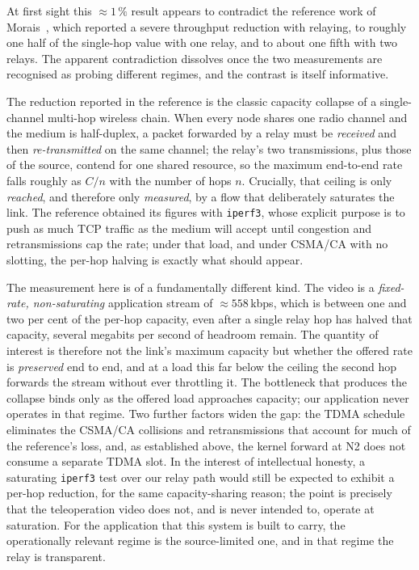 At first sight this $\approx 1\,\%$ result appears to contradict the reference
work of Morais~\cite{morais2024synchronization}, which reported a severe
throughput reduction with relaying, to roughly one half of the
single-hop value with one relay, and to about one fifth with two relays. The
apparent contradiction dissolves once the two measurements are recognised as
probing different regimes, and the contrast is itself informative.

The reduction reported in the reference is the classic capacity collapse of a
single-channel multi-hop wireless chain. When every node shares one radio
channel and the medium is half-duplex, a packet forwarded by a relay must be
\emph{received} and then \emph{re-transmitted} on the same channel; the relay's
two transmissions, plus those of the source, contend for one shared resource,
so the maximum end-to-end rate falls roughly as $C/n$ with the number of hops
$n$. Crucially, that ceiling is only \emph{reached}, and therefore only
\emph{measured}, by a flow that deliberately saturates the link. The reference
obtained its figures with \texttt{iperf3}, whose explicit purpose is to push as
much TCP traffic as the medium will accept until congestion and retransmissions
cap the rate; under that load, and under CSMA/CA with no slotting, the per-hop
halving is exactly what should appear.

The measurement here is of a fundamentally different kind. The video is a
\emph{fixed-rate, non-saturating} application stream of $\approx 558$\,kbps,
which is between one and two per cent of the per-hop capacity, even after a
single relay hop has halved that capacity, several megabits per second of
headroom remain. The quantity of interest is therefore not the link's maximum
capacity but whether the offered rate is \emph{preserved} end to end, and at a
load this far below the ceiling the second hop forwards the stream without ever
throttling it. The bottleneck that produces the collapse binds only as the
offered load approaches capacity; our application never operates in that
regime. Two further factors widen the gap: the TDMA schedule eliminates the
CSMA/CA collisions and retransmissions that account for much of the reference's
loss, and, as established above, the kernel forward at N2 does not consume a
separate TDMA slot. In the interest of intellectual honesty, a saturating
\texttt{iperf3} test over our relay path would still be expected to exhibit a
per-hop reduction, for the same capacity-sharing reason; the point is precisely
that the teleoperation video does not, and is never intended to, operate at
saturation. For the application that this system is built to carry, the
operationally relevant regime is the source-limited one, and in that regime the
relay is transparent.

